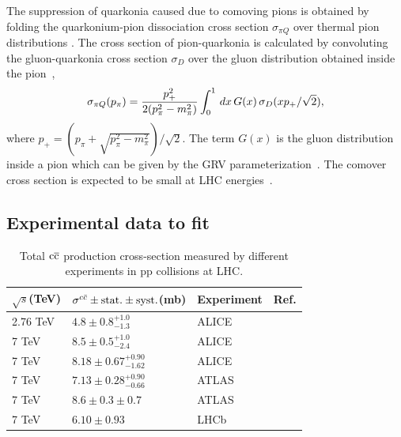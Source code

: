 \documentclass[12pt,a4paper,final]{iopart} %
\newcommand{\ccbar}{\rm{c\overline{c}}}
\begin{document}
The suppression of quarkonia caused due to comoving pions is obtained by folding the quarkonium-pion
dissociation cross section $\sigma_{\pi Q}$ over thermal pion distributions \cite{Vogt:1988fj}. 
The  cross section of pion-quarkonia is calculated by convoluting the gluon-quarkonia cross section $\sigma_D$
over the gluon distribution obtained inside the pion~\cite{Arleo:2001mp},
\begin{equation}
\sigma_{\pi Q} (p_{\pi}) = {p_+^2 \over 2(p_\pi^2 - m_\pi^2)} \int_0^1 \, dx \, G(x) \, \sigma_D(xp_+/\sqrt {2}),
\end{equation}
where $p_+ = (p_\pi + \sqrt{p_\pi^2-m_\pi^2})/\sqrt{2}$. The term  $G(x)$ is the gluon distribution inside a pion which 
can be given by the GRV parameterization~\cite{Gluck:1991ey}. 
The comover cross section  is expected  to be small  at LHC energies~\cite{Lourenco:2008sk}.

\subsection{Experimental data to fit}

\begin{table}[b]
\caption{Total $\ccbar$ production cross-section measured by different experiments in pp collisions at LHC.}
\begin{tabular}{l|l|l|l}
\hline 
\hline
  $\sqrt{s}$(TeV)           &$\sigma^{c\bar{c}}\pm {\rm stat.}\pm {\rm syst.}$(mb)            &Experiment      &Ref.  \\              
\hline
 2.76 TeV                   &$4.8\pm0.8^{+1.0}_{-1.3}$           & ALICE     &\cite{Abelev:2012vra}               \\
 7 TeV                      &$8.5\pm0.5^{+1.0}_{-2.4}$           & ALICE     &\cite{Abelev:2012vra}               \\
 7 TeV                      &$8.18\pm0.67^{+0.90}_{-1.62}$        & ALICE     &\cite{Adam:2016ich}               \\
 7 TeV                      &$7.13\pm0.28^{+0.90}_{-0.66}$        & ATLAS     &\cite{ATLAS:2011fea}               \\
 7 TeV                      &$8.6\pm0.3\pm0.7$                 & ATLAS     &\cite{Aad:2015zix}               \\
 7 TeV                      &$6.10\pm0.93$                    & LHCb     &\cite{LHCb:2010lga}               \\
 \hline
\hline
\end{tabular}
\label{CCBarCrossExp}
\end{table}
\end{document}
